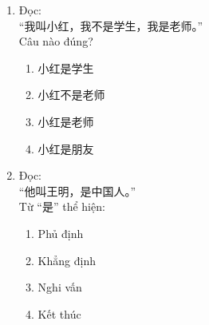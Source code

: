 \documentclass{article}
\begin{document}
\begin{CJK*}{UTF8}{gbsn}
\begin{multicols}{2}
\begin{enumerate}[label=\textbf{Câu \arabic*.}, leftmargin=*, itemsep=1.2em]
\item Đọc: \\
“我叫小红，我不是学生，我是老师。” \\
Câu nào đúng?
\begin{enumerate}[label=A.]
\item 小红是学生
\item 小红不是老师
\item 小红是老师
\item 小红是朋友
\end{enumerate}

\item Đọc: \\
“他叫王明，是中国人。” \\
Từ “是” thể hiện:
\begin{enumerate}[label=A.]
\item Phủ định
\item Khẳng định
\item Nghi vấn
\item Kết thúc
\end{enumerate}

\end{enumerate}
\end{multicols}
\end{CJK*}
\end{document}
